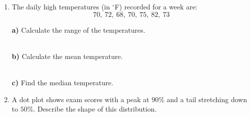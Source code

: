 \documentclass[12pt, letterpaper, fleqn]{article}
\newcommand{\blanklong}{\underline{\hspace{6.5cm}}}
\begin{document}
\begin{enumerate}[itemsep=1.5cm, leftmargin=0.6cm]
\item The daily high temperatures (in $^\circ$F) recorded for a week are: \\
$$70, \ 72, \ 68, \ 70, \ 75, \ 82, \ 73$$
\vspace{1cm}

\textbf{a)} Calculate the range of the temperatures. \blanklong \\ \\
\vspace{1cm}

\textbf{b)} Calculate the mean temperature. \blanklong \\ \\
\vspace{1cm}

\textbf{c)} Find the median temperature. \blanklong \\

\item A dot plot shows exam scores with a peak at $90\%$ and a tail stretching down to $50\%$. Describe the shape of this distribution.
\end{enumerate}
\end{document}
